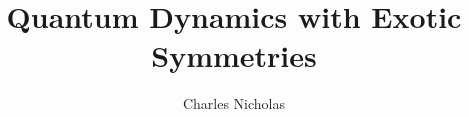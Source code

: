 \documentclass[defaultstyle,11pt,english]{thesis}
\title{Quantum Dynamics with Exotic Symmetries}
\author{Charles Nicholas} %
  {Stahl} %
\begin{document}









\nocite{Carroll2002Alice}


\begin{singlespacing}
\printbibliography[
  title={References},
  heading=bibintoc
]
\end{singlespacing}


\appendix



\end{document}
